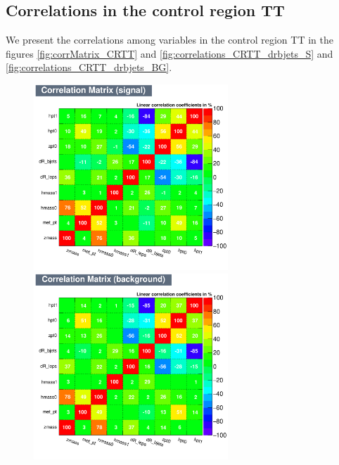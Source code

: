 \subsection{Correlations in the control region TT}
We present the correlations among variables in the control region TT in the figures \ref{fig:corrMatrix_CRTT} and
\ref{fig:correlations_CRTT_drbjets_S} and \ref{fig:correlations_CRTT_drbjets_BG}.

\begin{figure}[!htb]%
\centering

\includegraphics[width=0.65\textwidth]{figures/CRTT/dataset/plots/CorrelationMatrixS.pdf}
\bigbreak
\includegraphics[width=0.65\textwidth]{figures/CRTT/dataset/plots/CorrelationMatrixB.pdf}

\end{figure}
